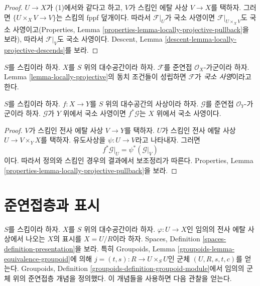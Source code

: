 \begin{proof}
$U \to X$가 (1)에서와 같다고 하고, $V$가 스킴인 에탈 사상
$V \to X$를 택하자. 그러면 $\{U \times_X V \to V\}$는 스킴의 fppf
덮개이다. 따라서 $\mathcal{F}|_U$가 국소 사영이면
$\mathcal{F}|_{U \times_X V}$도 국소 사영이고(Properties, Lemma
\ref{properties-lemma-locally-projective-pullback}을 보라), 따라서
$\mathcal{F}|_V$도 국소 사영이다. Descent, Lemma
\ref{descent-lemma-locally-projective-descends}를 보라.
\end{proof}

\begin{definition}
\label{definition-locally-projective}
$S$를 스킴이라 하자. $X$를 $S$ 위의 대수공간이라 하자.
$\mathcal{F}$를 준연접 $\mathcal{O}_X$-가군이라 하자. Lemma
\ref{lemma-locally-projective}의 동치 조건들이 성립하면
$\mathcal{F}$가 {\it 국소 사영}이라고 한다.
\end{definition}

\begin{lemma}
\label{lemma-locally-projective-pullback}
$S$를 스킴이라 하자.
$f : X \to Y$를 $S$ 위의 대수공간의 사상이라 하자.
$\mathcal{G}$를 준연접 $\mathcal{O}_Y$-가군이라 하자.
$\mathcal{G}$가 $Y$ 위에서 국소 사영이면 $f^*\mathcal{G}$는 $X$ 위에서
국소 사영이다.
\end{lemma}

\begin{proof}
$V$가 스킴인 전사 에탈 사상 $V \to Y$를 택하자.
$U$가 스킴인 전사 에탈 사상 $U \to V \times_Y X$를 택하자.
유도사상을 $\psi : U \to V$라고 나타내자. 그러면
$$
f^*\mathcal{G}|_U = \psi^*(\mathcal{G}|_V)
$$
이다. 따라서 정의와 스킴인 경우의 결과에서 보조정리가 따른다.
Properties, Lemma
\ref{properties-lemma-locally-projective-pullback}을 보라.
\end{proof}


\section{준연접층과 표시}
\label{section-quasi-coherent-presentation}

\noindent
$S$를 스킴이라 하자. $X$를 $S$ 위의 대수공간이라 하자.
$\varphi : U \to X$인 임의의 전사 에탈 사상에서 나오는 $X$의 표시를
$X = U/R$이라 하자. Spaces, Definition
\ref{spaces-definition-presentation}을 보라. 특히 Groupoids, Lemma
\ref{groupoids-lemma-equivalence-groupoid}에 의해
$j = (t, s) : R \to U \times_S U$인 군체 $(U, R, s, t, c)$를 얻는다.
Groupoids, Definition \ref{groupoids-definition-groupoid-module}에서 임의의
군체 위의 준연접층 개념을 정의했다. 이 개념들을 사용하면 다음 관찰을
얻는다.


